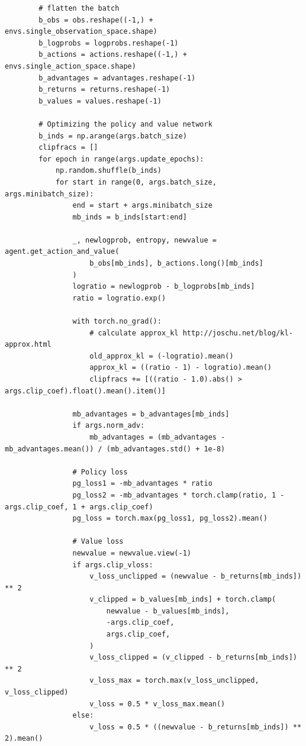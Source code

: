 \documentclass[11pt,a4paper]{article}
\begin{document}
\begin{lstlisting}
        # flatten the batch
        b_obs = obs.reshape((-1,) + envs.single_observation_space.shape)
        b_logprobs = logprobs.reshape(-1)
        b_actions = actions.reshape((-1,) + envs.single_action_space.shape)
        b_advantages = advantages.reshape(-1)
        b_returns = returns.reshape(-1)
        b_values = values.reshape(-1)

        # Optimizing the policy and value network
        b_inds = np.arange(args.batch_size)
        clipfracs = []
        for epoch in range(args.update_epochs):
            np.random.shuffle(b_inds)
            for start in range(0, args.batch_size, args.minibatch_size):
                end = start + args.minibatch_size
                mb_inds = b_inds[start:end]

                _, newlogprob, entropy, newvalue = agent.get_action_and_value(
                    b_obs[mb_inds], b_actions.long()[mb_inds]
                )
                logratio = newlogprob - b_logprobs[mb_inds]
                ratio = logratio.exp()

                with torch.no_grad():
                    # calculate approx_kl http://joschu.net/blog/kl-approx.html
                    old_approx_kl = (-logratio).mean()
                    approx_kl = ((ratio - 1) - logratio).mean()
                    clipfracs += [((ratio - 1.0).abs() > args.clip_coef).float().mean().item()]

                mb_advantages = b_advantages[mb_inds]
                if args.norm_adv:
                    mb_advantages = (mb_advantages - mb_advantages.mean()) / (mb_advantages.std() + 1e-8)

                # Policy loss
                pg_loss1 = -mb_advantages * ratio
                pg_loss2 = -mb_advantages * torch.clamp(ratio, 1 - args.clip_coef, 1 + args.clip_coef)
                pg_loss = torch.max(pg_loss1, pg_loss2).mean()

                # Value loss
                newvalue = newvalue.view(-1)
                if args.clip_vloss:
                    v_loss_unclipped = (newvalue - b_returns[mb_inds]) ** 2
                    v_clipped = b_values[mb_inds] + torch.clamp(
                        newvalue - b_values[mb_inds],
                        -args.clip_coef,
                        args.clip_coef,
                    )
                    v_loss_clipped = (v_clipped - b_returns[mb_inds]) ** 2
                    v_loss_max = torch.max(v_loss_unclipped, v_loss_clipped)
                    v_loss = 0.5 * v_loss_max.mean()
                else:
                    v_loss = 0.5 * ((newvalue - b_returns[mb_inds]) ** 2).mean()


\end{lstlisting}
\end{document}
